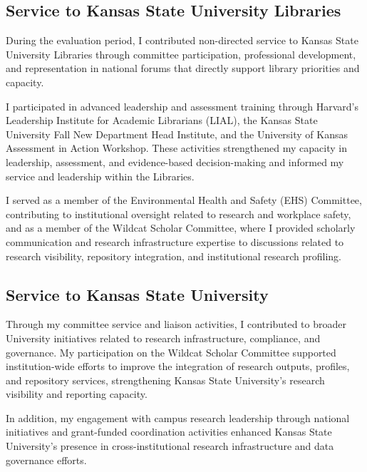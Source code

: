 \ExampleNote

\subsection*{Service to Kansas State University Libraries}

During the evaluation period, I contributed non-directed service to Kansas State University Libraries through committee participation, professional development, and representation in national forums that directly support library priorities and capacity.

I participated in advanced leadership and assessment training through Harvard’s Leadership Institute for Academic Librarians (LIAL), the Kansas State University Fall New Department Head Institute, and the University of Kansas Assessment in Action Workshop. These activities strengthened my capacity in leadership, assessment, and evidence-based decision-making and informed my service and leadership within the Libraries.

I served as a member of the Environmental Health and Safety (EHS) Committee, contributing to institutional oversight related to research and workplace safety, and as a member of the Wildcat Scholar Committee, where I provided scholarly communication and research infrastructure expertise to discussions related to research visibility, repository integration, and institutional research profiling.

\subsection*{Service to Kansas State University}

Through my committee service and liaison activities, I contributed to broader University initiatives related to research infrastructure, compliance, and governance. My participation on the Wildcat Scholar Committee supported institution-wide efforts to improve the integration of research outputs, profiles, and repository services, strengthening Kansas State University’s research visibility and reporting capacity.

In addition, my engagement with campus research leadership through national initiatives and grant-funded coordination activities enhanced Kansas State University’s presence in cross-institutional research infrastructure and data governance efforts.

